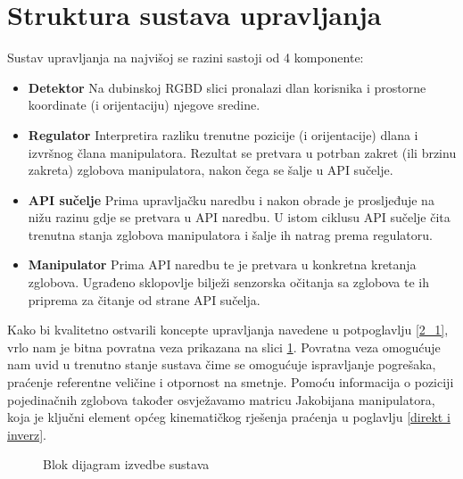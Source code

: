\documentclass[times, utf8, diplomski, numeric]{fer}
\begin{document}
\section{Struktura sustava upravljanja}
Sustav upravljanja na najvišoj se razini sastoji od 4 komponente:
\begin{itemize}
  \item \textbf{Detektor} Na dubinskoj RGBD slici pronalazi dlan korisnika i prostorne koordinate (i orijentaciju) njegove sredine. 
  \item \textbf{Regulator} Interpretira razliku trenutne pozicije (i orijentacije) dlana i izvršnog člana manipulatora. 
  Rezultat se pretvara u potrban zakret (ili brzinu zakreta) zglobova manipulatora, nakon čega se šalje u API sučelje.
  \item  \textbf{API sučelje} Prima upravljačku naredbu i nakon obrade je prosljeđuje na nižu razinu gdje se pretvara u API naredbu.
  U istom ciklusu API sučelje čita trenutna stanja zglobova manipulatora i šalje ih natrag prema regulatoru.
  \item  \textbf{Manipulator} Prima API naredbu te je pretvara u konkretna kretanja zglobova. 
  Ugrađeno sklopovlje bilježi senzorska očitanja sa zglobova te ih priprema za čitanje od strane API sučelja.
\end{itemize}

Kako bi kvalitetno ostvarili koncepte upravljanja navedene u potpoglavlju \ref{2_1}, vrlo nam je bitna povratna veza prikazana na slici \ref{izvedba}.
Povratna veza omogućuje nam uvid u trenutno stanje sustava čime se omogućuje ispravljanje pogrešaka, praćenje referentne veličine i otpornost na smetnje.
Pomoću informacija o poziciji pojedinačnih zglobova također osvježavamo matricu Jakobijana manipulatora, koja je ključni element općeg kinematičkog rješenja praćenja u poglavlju \ref{direkt i inverz}.

\begin{figure}[!h]
\centering
{}
\caption{Blok dijagram izvedbe sustava}\label{izvedba}
\end{figure}
\end{document}
